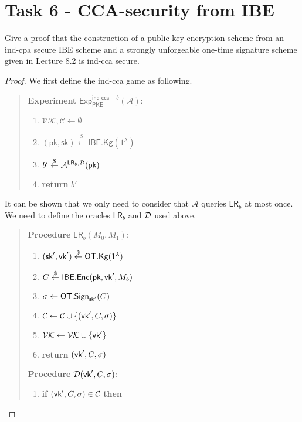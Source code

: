 \documentclass[12pt]{article}
\newcommand{\getsr}{\stackrel{\$}{\gets}}
\newcommand{\C}{\mathcal{C}}
\theoremstyle{definition}
\newcommand{\PKE}{\textsf{PKE}}
\newcommand{\Kg}{\textsf{Kg}}
\newcommand{\Enc}{\textsf{Enc}}
\newcommand{\pk}{\textsf{pk}}
\newcommand{\sk}{\textsf{sk}}
\newcommand{\A}{\mathcal{A}}
\newcommand{\LR}{\textsf{LR}}
\begin{document}
\section{Task 6 - CCA-security from IBE}
Give a proof that the construction of a public-key encryption scheme from an ind-cpa
secure IBE scheme and a strongly unforgeable one-time signature scheme given in Lecture 8.2 is ind-cca secure.
\newcommand{\Exp}{\textsf{Exp}}
\newcommand{\cpa}{\textsf{ind-cpa}}
\newcommand{\cca}{\textsf{ind-cca}}
\newcommand{\msk}{\textsf{msk}}
\newcommand{\pp}{\textsf{pp}}
\newcommand{\IBE}{\textsf{IBE}}
\newcommand{\OT}{\textsf{OT}}
\newcommand{\KeyExt}{\textsf{KeyExt}}
\newcommand{\bad}{\textsf{bad}}
\newcommand{\VK}{\mathcal{VK}}
\begin{proof}
We first define the ind-cca game as following.
\begin{quote}
{\bf Experiment} $\Exp_{\PKE}^{\cca-b}(\A)$:
\begin{enumerate}
\item $\VK, \C \gets \emptyset$
\item $(\pk, \sk) \getsr \IBE.\Kg(1^\lambda)$
\item $b' \getsr \A^{\LR_b, \D}(\pk)$
\item {\bf return} $b'$
\end{enumerate}
\end{quote}
It can be shown that we only need to consider that $\A$ queries $\LR_b$ at most once. 
We need to define the oracles $\LR_b$ and $\mathcal{D}$ used above.
\begin{quote}
\begin{minipage}[t]{0.4\textwidth}
{\bf Procedure} $\LR_b(M_0,M_1)$:
\begin{enumerate}
\item $(\sk',\vk') \getsr \OT.\Kg(1^\lambda)$
\item $C \getsr \IBE.\Enc(\pk,\vk',M_b)$
\item $\sigma \gets \OT.\Sign_{\sk'}(C)$
\item $\C \gets \C \cup \{(\vk', C, \sigma)\}$
\item $\VK \gets \VK \cup \{\vk'\}$
\item {\bf return} $(\textsf{vk}', C, \sigma)$
\end{enumerate}
\end{minipage}
\begin{minipage}[t]{0.4\textwidth}
{\bf Procedure} $\mathcal{D}(\textsf{vk}', C,\sigma)$:
\begin{enumerate}
\item {\bf if} $(\vk', C,\sigma) \in \C$ {\bf then}

\end{enumerate}
\end{minipage}
\end{quote}
\end{proof}
\end{document}
